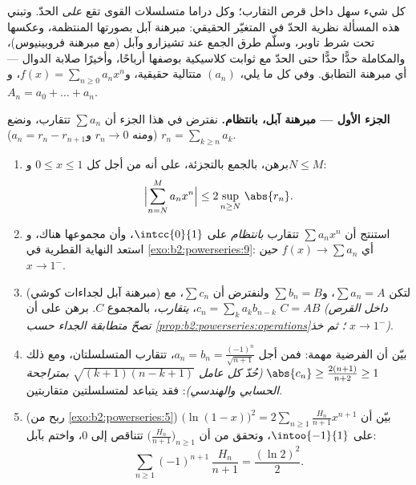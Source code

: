 \begin{problem}\label{pb:b2:powerseries:1}
كل شيء سهل داخل قرص التقارب؛ وكل
دراما متسلسلات القوى تقع \emph{على} الحدّ. وتبني هذه
المسألة نظرية الحدّ في المتغيّر الحقيقي: مبرهنة آبل
بصورتها المنتظمة، وعكسها تحت شرط تاوبر،
وسلّم طرق الجمع عند تشيزارو وآبل
(مع مبرهنة فروبينيوس)، والمكاملة حدًّا حدًّا حتى
الحدّ مع ثوابت كلاسيكية بوصفها أرباحًا، وأخيرًا
صلابة الدوال  --- أي مبرهنة
التطابق.
وفي كل ما يلي، $(a_n)$ متتالية حقيقية، و$f(x) = \sum_{n\geq0}
a_nx^n$، و$A_n = a_0 + \dots + a_n$.

\medskip
\noindent\textbf{الجزء الأول --- مبرهنة آبل، بانتظام.} نفترض
في هذا الجزء أن $\sum a_n$ تتقارب، ونضع $r_n =
\sum_{k\geq n} a_k$ (ومنه $r_n \to 0$ و$a_n = r_n -
r_{n+1}$).
\begin{enumerate}
  \item برهن، بالجمع بالتجزئة، على أنه من أجل كل $0 \leq x
        \leq 1$ و$N \leq M$:
        \[
        \Bigl|\sum_{n=N}^{M} a_n x^n\Bigr|
        \leq 2\sup_{n \geq N}\,\abs{r_n} .
        \]
  \item استنتج أن $\sum a_nx^n$ تتقارب \emph{بانتظام} على
        $\intcc{0}{1}$، وأن مجموعها  هناك، و
        استعد النهاية القطرية في
        \cref{exo:b2:powerseries:9}: أي $f(x) \to \sum a_n$ حين $x
        \to 1^-$.
  \item (مبرهنة آبل لجداءات كوشي) لتكن $\sum a_n = A$،
        و$\sum b_n = B$ ولنفترض أن  $\sum
        c_n$، مع $c_n = \sum_{k} a_kb_{n-k}$، \emph{يتقارب}،
        بالمجموع $C$. برهن على أن $C = AB$ \emph{(داخل القرص تصحّ
        متطابقة الجداء حسب
        \cref{prop:b2:powerseries:operations}؛ ثم خذ $x \to
        1^-$)}.
  \item بيّن أن الفرضية مهمة: فمن أجل $a_n = b_n =
        \frac{(-1)^n}{\sqrt{n+1}}$، تتقارب المتسلسلتان، ومع ذلك
        $\abs{c_n} \geq \frac{2(n+1)}{n+2} \geq 1$ \emph{(حُدّ
        كل عامل $\sqrt{(k+1)(n-k+1)}$ بمتراجحة الحسابي والهندسي)}: فقد
        يتباعد  لمتسلسلتين متقاربتين.
  \item (ربح من \cref{exo:b2:powerseries:5}) بيّن أن
        $\bigl(\ln(1-x)\bigr)^2 = 2\sum_{n\geq1}
        \frac{H_n}{n+1}x^{n+1}$ على $\intoo{-1}{1}$، وتحقق من أن
        $\bigl(\frac{H_n}{n+1}\bigr)_{n\geq1}$ تتناقص إلى
        $0$، واختم بآبل:
        \[
        \sum_{n\geq1} (-1)^{n+1}\,\frac{H_n}{n+1}
        = \frac{(\ln 2)^2}{2} .
        \]
\end{enumerate}


\end{problem}
